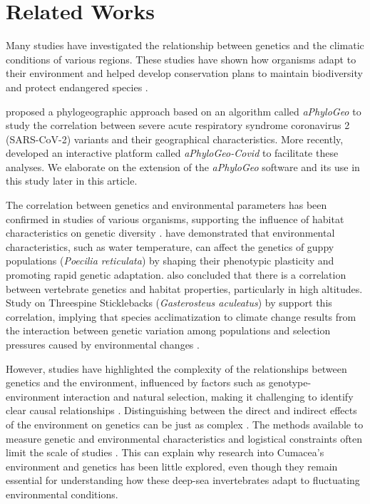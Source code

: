 \section{Related Works}\label{related-works}
Many studies have investigated the relationship between genetics and the climatic conditions of various regions. These studies have shown how organisms adapt to their environment \citep{fc_genomic_2012} and helped develop conservation plans to maintain biodiversity and protect endangered species \citep{balkenhol_identifying_2009}.

\cite{koshkarov_phylogeography_2022} proposed a phylogeographic approach based on an algorithm called \textit{aPhyloGeo} to study the correlation between severe acute respiratory syndrome coronavirus 2 (SARS-CoV-2) variants and their geographical characteristics. More recently, \cite{li_aphylogeo-covid_2023} developed an interactive platform called \textit{aPhyloGeo-Covid} to facilitate these analyses. We elaborate on the extension of the \textit{aPhyloGeo} software and its use in this study later in this article.

The correlation between genetics and environmental parameters has been confirmed in studies of various organisms, supporting the influence of habitat characteristics on genetic diversity \citep{colosimo_widespread_2005,cheviron_genomic_2012}. \cite{ghalambor_adaptive_2007} have demonstrated that environmental characteristics, such as water temperature, can affect the genetics of guppy populations (\emph{Poecilia reticulata}) by shaping their phenotypic plasticity and promoting rapid genetic adaptation. \cite{cheviron_genomic_2012} also concluded that there is a correlation between vertebrate genetics and habitat properties, particularly in high altitudes. Study on Threespine Sticklebacks (\emph{Gasterosteus aculeatus}) by \citep{colosimo_widespread_2005} support this correlation, implying that species acclimatization to climate change results from the interaction between genetic variation among populations and selection pressures caused by environmental changes \citep{hoffmann_climate_2011}.

However, studies have highlighted the complexity of the relationships between genetics and the environment, influenced by factors such as genotype-environment interaction and natural selection, making it challenging to identify clear causal relationships \citep{balkenhol_identifying_2009}. Distinguishing between the direct and indirect effects of the environment on genetics can be just as complex  \citep{manel_perspectives_2010, balkenhol_landscape_2019}. The methods available to measure genetic and environmental characteristics and logistical constraints often limit the scale of studies \citep{manel_perspectives_2010, shafer_widespread_2013}. This can explain why research into Cumacea’s environment and genetics has been little explored, even though they remain essential for understanding how these deep-sea invertebrates adapt to fluctuating environmental conditions.

